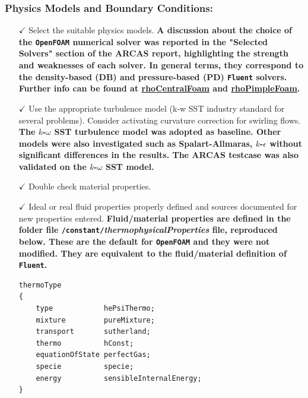 \documentclass[12pt]{article}
\begin{document}
\subsubsection*{Physics Models and Boundary Conditions:}
\begin{itemize}
    \item[$\checkmark$] Select the suitable physics models.
    \textbf{A discussion about the choice of the \texttt{OpenFOAM} numerical solver was reported in the "Selected Solvers" section of the ARCAS report, highlighting the strength and weaknesses of each solver. In general terms, they correspond to the density-based (DB) and pressure-based (PD) \texttt{Fluent} solvers. Further info can be found at \href{https://www.openfoam.com/documentation/guides/latest/doc/guide-applications-solvers-compressible-rhoCentralFoam.html}{rhoCentralFoam} and \href{https://www.openfoam.com/documentation/guides/latest/doc/guide-applications-solvers-compressible-rhoPimpleFoam.html}{rhoPimpleFoam}.}
    \item[$\checkmark$] Use the appropriate turbulence model (k-w SST industry standard for several problems). Consider activating curvature correction for swirling flows.
    \textbf{The $k$-$\omega$ SST turbulence model was adopted as baseline. Other models were also investigated such as Spalart-Allmaras, $k$-$\epsilon$ without significant differences in the results. The ARCAS testcase was also validated on the $k$-$\omega$ SST model.}
    \item[$\checkmark$] Double check material properties.
    \item[$\checkmark$] Ideal or real fluid properties properly defined and sources documented for new properties entered. 
    \textbf{Fluid/material properties are defined in the folder file \texttt{/constant/}\textit{thermophysicalProperties} file, reproduced below. These are the default for \texttt{OpenFOAM} and they were not modified. They are equivalent to the fluid/material definition of \texttt{Fluent}.}
    \begin{lstlisting}
thermoType
{
    type            hePsiThermo;
    mixture         pureMixture;
    transport       sutherland;
    thermo          hConst;
    equationOfState perfectGas;
    specie          specie;
    energy          sensibleInternalEnergy;
}


\end{lstlisting}
\end{itemize}
\end{document}
